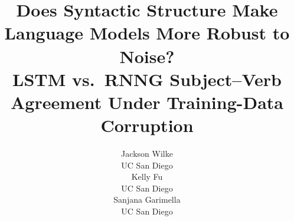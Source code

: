\documentclass[11pt]{article}
\title{Does Syntactic Structure Make Language Models More Robust to Noise?\\
       LSTM vs.\ RNNG Subject--Verb Agreement Under Training-Data Corruption}
\author{Jackson Wilke \\
  UC San Diego \\\And
  Kelly Fu \\
  UC San Diego \\\And
  Sanjana Garimella \\
  UC San Diego \\}
\begin{document}
\maketitle

\begin{abstract}

\end{abstract}












\nocite{*}


\appendix

\end{document}

